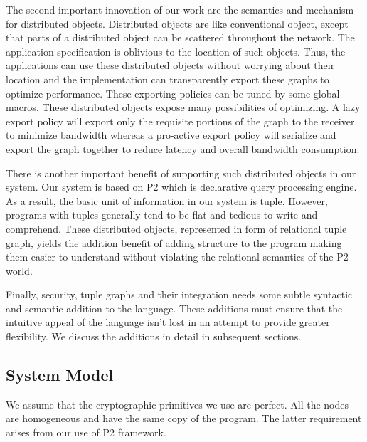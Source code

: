 The second important innovation of our work are the semantics and mechanism for distributed objects. Distributed objects are like conventional object, except that parts of a distributed object can be scattered throughout the network. The application specification is oblivious to the location of such objects. Thus, the applications can use these distributed objects without worrying about their location and the implementation can transparently export these graphs to optimize performance. These exporting policies can be tuned by some global macros. These distributed objects expose many possibilities of optimizing. A lazy export policy will export only the requisite portions of the graph to the receiver to minimize bandwidth whereas a pro-active export policy will serialize and export the graph together to reduce latency and overall bandwidth consumption.

There is another important benefit of supporting such distributed objects in our system. Our system is based on P2 which is declarative query processing engine. As a result, the basic unit of information in our system is tuple. However, programs with tuples generally tend to be flat and tedious to write and comprehend. These distributed objects, represented in form of relational tuple graph, yields the addition benefit of adding structure to the program making them easier to understand without violating the relational semantics of the P2 world.

Finally, security, tuple graphs and their integration needs some subtle syntactic and semantic addition to the language. These additions must ensure that the intuitive appeal of the language isn't lost in an attempt to provide greater flexibility. We discuss the additions in detail in subsequent sections.

\subsection{System Model}

We assume that the cryptographic primitives we use are perfect. All the nodes are homogeneous and have the same copy of the program. The latter requirement arises from our use of P2 framework.




